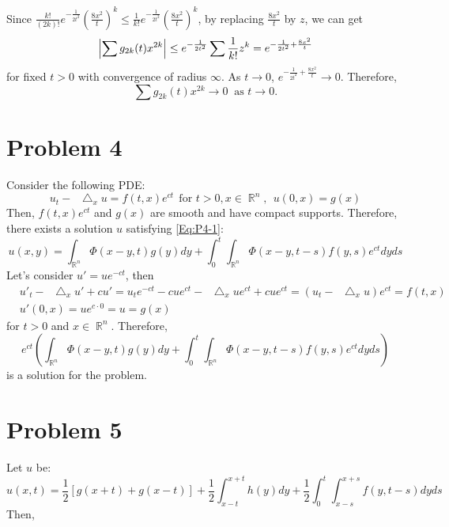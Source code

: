 \documentclass{article}
\DeclareMathOperator{\rr}{\mathbb{R}}
\newcommand*\Laplace{\mathop{}\!\mathbin\bigtriangleup}
\begin{document}
\begin{enumerate}
Since $\frac{k!}{(2k)!}e^{-\frac{1}{2t^2}}\left(\frac{8x^2}{t}\right)^k\leq \frac{1}{k!}e^{-\frac{1}{2t^2}}\left(\frac{8x^2}{t}\right)^k$, by replacing $\frac{8x^2}{t}$ by $z$, we can get
\begin{equation*}
\abs{\sum g_{2k}(t)x^{2k}}\leq e^{-\frac{1}{2t^2}}\sum\frac{1}{k!}z^k=e^{-\frac{1}{2t^2}+\frac{8x^2}{t}}
\end{equation*}
for fixed $t>0$ with convergence of radius $\infty$. As $t\rightarrow 0$, $e^{-\frac{1}{2t^2}+\frac{8x^2}{t}}\rightarrow 0$. Therefore, 
\begin{equation*}
\sum g_{2k}(t)x^{2k}\rightarrow 0 ~\text{ as }t\rightarrow 0.
\end{equation*}
\end{enumerate}

\section*{Problem 4}
Consider the following PDE:
\begin{equation}\label{Eq:P4-1}
u_t-\Laplace_x u=f(t,x)e^{ct}~~\text{for }t>0,x\in\rr^n,~~u(0,x)=g(x)
\end{equation}
Then, $f(t,x)e^{ct}$ and $g(x)$ are smooth and have compact supports. Therefore, there exists a solution $u$ satisfying \eqref{Eq:P4-1}:
\begin{equation*}
u(x,y)=\int_{\rr^n}\Phi(x-y,t)g(y)dy+\int_0^t\int_{\rr^n}\Phi(x-y,t-s)f(y,s)e^{ct}dyds
\end{equation*}
Let's consider $u'=ue^{-ct}$, then
\begin{equation*}
\begin{split}
&u'_t-\Laplace_x u'+cu'=u_te^{-ct}-cue^{ct}-\Laplace_x ue^{ct}+cue^{ct}=(u_t-\Laplace_x u)e^{ct}=f(t,x) \\
&u'(0,x)=ue^{c\cdot 0}=u=g(x)
\end{split}
\end{equation*}
for $t>0$ and $x\in \rr^n$. Therefore, 
\begin{equation*}
e^{ct}\left(\int_{\rr^n}\Phi(x-y,t)g(y)dy+\int_0^t\int_{\rr^n}\Phi(x-y,t-s)f(y,s)e^{ct}dyds\right)
\end{equation*}
is a solution for the problem.

\section*{Problem 5}
Let $u$ be:
\begin{equation}
u(x,t)=\frac{1}{2}[g(x+t)+g(x-t)]+\frac{1}{2}\int_{x-t}^{x+t} h(y)dy + \frac{1}{2}\int_0^t\int_{x-s}^{x+s}f(y, t-s)dyds 
\end{equation}
Then,
\end{document}
